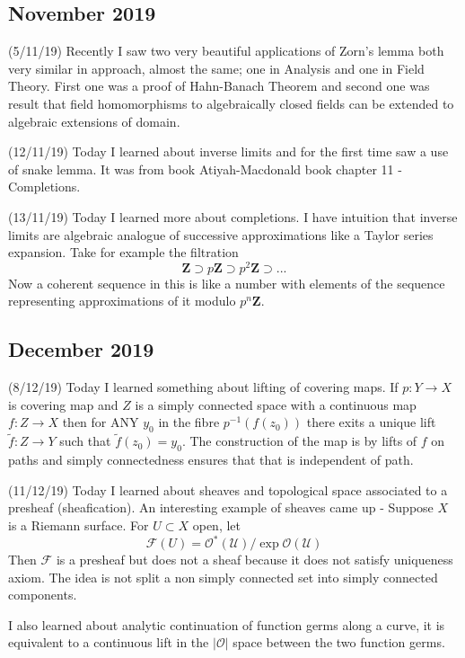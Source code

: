 \documentclass[12pt,a4paper]{article}
\begin{document}
\subsection*{November 2019}

\quad (5/11/19) Recently I saw two very beautiful applications of Zorn's lemma both very similar in approach, almost the same; one in Analysis and one in Field Theory. First one was a proof of Hahn-Banach Theorem and second one was result that field homomorphisms to algebraically closed fields can be extended to algebraic extensions of domain.

(12/11/19) Today I learned about inverse limits and for the first time saw a use of snake lemma. It was from book Atiyah-Macdonald book chapter 11 - Completions.

(13/11/19) Today I learned more about completions. I have intuition that inverse limits are algebraic analogue of successive approximations like a Taylor series expansion. Take for example the filtration 
\[ \mathbf{Z} \supset p\mathbf{Z} \supset p^2\mathbf{Z} \supset ... \] Now a coherent sequence in this is like a number with elements of the sequence representing approximations of it modulo $p^n\mathbf{Z}$. 

\subsection*{December 2019}

\quad (8/12/19) Today I learned something about lifting of covering maps. If $p: Y \to X$ is covering map and $Z$ is a simply connected space with a continuous map $f: Z \to X$ then for ANY $y_0$ in the fibre $p^{-1}(f(z_0))$ there exits a unique lift $\tilde{f} : Z \to Y$ such that $\tilde{f}(z_0)=y_0$. The construction of the map is by lifts of $f$ on paths and simply connectedness ensures that that is independent of path. 

(11/12/19) Today I learned about sheaves and topological space associated to a presheaf (sheafication). An interesting example of sheaves came up - Suppose $X$ is a Riemann surface. For $U\subset X$ open, let
 \[ \mathcal{F}(U)=\mathcal{O^*(U)}/ \exp  \mathcal{O(U)} \]
Then $\mathcal{F}$ is a presheaf but does not a sheaf because it does not satisfy uniqueness axiom. The idea is not split a non simply connected set into simply connected components.

I also learned about analytic continuation of function germs along a curve, it is equivalent to a continuous lift in the $|\mathcal{O}|$ space between the two function germs.
\end{document}
